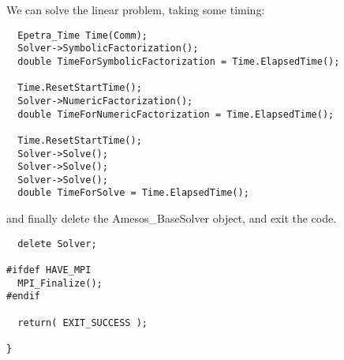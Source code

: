 \documentclass[11pt]{SANDreport}
\begin{document}
We can solve the linear problem, taking some timing:
\begin{verbatim}  
  Epetra_Time Time(Comm);      
  Solver->SymbolicFactorization();
  double TimeForSymbolicFactorization = Time.ElapsedTime();
  
  Time.ResetStartTime();  
  Solver->NumericFactorization();
  double TimeForNumericFactorization = Time.ElapsedTime();
   
  Time.ResetStartTime();
  Solver->Solve();
  Solver->Solve();
  Solver->Solve();
  double TimeForSolve = Time.ElapsedTime();
\end{verbatim}
and finally delete the Amesos\_BaseSolver object, and exit the code.

\begin{verbatim}  
  delete Solver;
    
#ifdef HAVE_MPI
  MPI_Finalize();
#endif

  return( EXIT_SUCCESS );

}
\end{verbatim}



\end{document}
